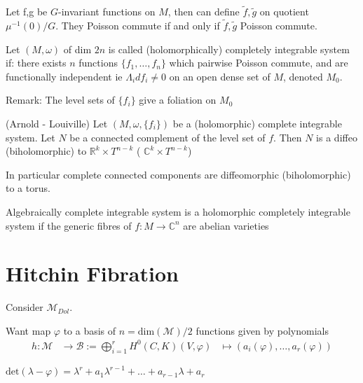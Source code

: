 Let f,g be $G$-invariant functions on $M$, then can define $\tilde{f}, \tilde{g}$ on quotient $\mu^{-1} (0)/ G $. 
They Poisson commute if and only if  $\tilde{f}, \tilde{g} $ Poisson commute. 

\begin{definition}
    Let $(M, \omega) $ of dim $2n$ is called (holomorphically) completely integrable system if:
    there exists $n$ functions $\{f_1, \dots, f_n \}$ which pairwise Poisson commute, 
    and are functionally independent ie $\Lambda_i df_i \neq 0 $ on an open dense set of $M$, denoted $M_0$. 
\end{definition}

Remark: 
The level sets of $\{f_i \} $ give a foliation on $M_0$ 

\begin{theorem}
    (Arnold - Louiville) 
    Let $(M, \omega, \{f_i \} ) $ be a (holomorphic) complete integrable system. 
    Let $N$ be a connected complement of the level set of $f$. 
    Then $ N$ is a diffeo (biholomorphic) to $ \mathbb{R} ^k \times T^{n-k} $ ( $ \mathbb{C} ^k \times T^{n-k} $) 

    In particular complete connected components are diffeomorphic (biholomorphic) to a torus. 
\end{theorem}

\begin{definition}
Algebraically complete integrable system is a holomorphic completely integrable system if the generic fibres of $f:M \rightarrow \mathbb{C} ^n $ are abelian varieties 
\end{definition}





\section{Hitchin Fibration} %

Consider $\mathcal{M}_{Dol} $. 

Want map $\varphi$ to a basis of $n = \mathrm{dim} (\mathcal{M}) /2 $ 
functions given by polynomials 
\begin{align}
    h: \mathcal{M} & \rightarrow  \mathcal{B} := \bigoplus _{i =1} ^r H^0 ( C, K ) 
    ( V, \varphi ) & \mapsto ( a_i (\varphi), \dots , a_r (\varphi) )
\end{align}

$\mathrm{det} ( \lambda - \varphi) = \lambda ^r  + a_1 \lambda^{r-1} +\dots + a_{r-1} \lambda + a_r $

